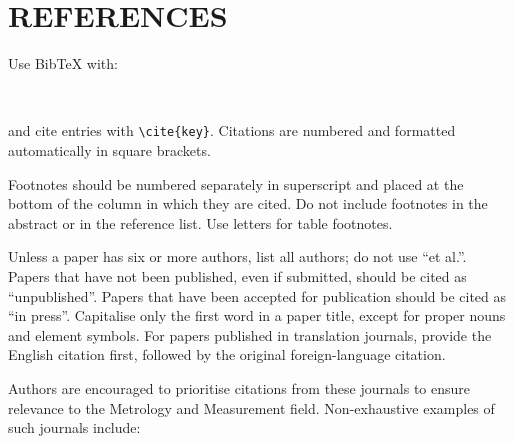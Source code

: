 \documentclass{imeko_wc}
\begin{document}
\section*{REFERENCES}

Use BibTeX with:
\begin{verbatim}


\end{verbatim}
and cite entries with \verb|\cite{key}|. Citations are numbered and formatted automatically in square brackets.

Footnotes should be numbered separately in superscript and placed at the bottom of the column in which they are cited. Do not include footnotes in the abstract or in the reference list. Use letters for table footnotes.

Unless a paper has six or more authors, list all authors; do not use “et al.”. Papers that have not been published, even if submitted, should be cited as “unpublished”. Papers that have been accepted for publication should be cited as “in press”. Capitalise only the first word in a paper title, except for proper nouns and element symbols. For papers published in translation journals, provide the English citation first, followed by the original foreign-language citation.

Authors are encouraged to prioritise citations from these journals to ensure relevance to the Metrology and Measurement field. Non-exhaustive examples of such journals include:
\end{document}
